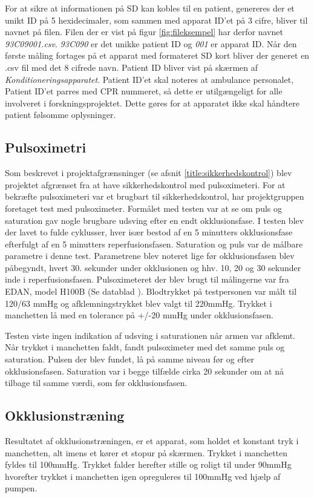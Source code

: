 For at sikre at informationen på SD kan kobles til en patient, genereres der et unikt ID på 5 hexidecimaler, som sammen med apparat ID'et på 3 cifre, bliver til navnet på filen. Filen der er vist på figur \ref{fig:fileksempel} har derfor navnet \textit{93C09001.csv}. \textit{93C090} er det unikke patient ID og \textit{001} er apparat ID. Når den første måling fortages på et apparat med formateret SD kort bliver der generet en .csv fil med det 8 cifrede navn. Patient ID bliver vist på skærmen af \textit{Konditioneringsapparatet}. Patient ID'et skal noteres at ambulance personalet, Patient ID'et parres med CPR nummeret, så dette er utilgængeligt for alle involveret i forskningsprojektet. Dette gøres for at apparatet ikke skal håndtere patient følsomme oplysninger.

\subsection{Pulsoximetri} \label{title:pulsOxi}
Som beskrevet i projektafgrænsninger (se afsnit \ref{title:sikkerhedskontrol}) blev projektet afgrænset fra at have sikkerhedskontrol med pulsoximeteri. For at bekræfte pulsoximeteri var et brugbart til sikkerhedskontrol, har projektgruppen foretaget test med pulsoximeter. Formålet med testen var at se om puls og saturation gav nogle brugbare udsving efter en endt okklusionsfase. I testen blev der lavet to fulde cyklusser, hver især bestod af en 5 minutters okklusionsfase efterfulgt af en 5 minutters reperfusionsfasen. Saturation og puls var de målbare parametre i denne test. Parametrene blev noteret lige før okklusionsfasen blev påbegyndt, hvert 30. sekunder under okklusionen og hhv. 10, 20 og 30 sekunder inde i reperfusionsfasen. Pulsoximeteret der blev brugt til målingerne var fra EDAN, model H100B (Se datablad \cite{RefWorks:30}). Blodtrykket på testpersonen var målt til 120/63 mmHg og afklemningstrykket blev valgt til 220mmHg. Trykket i manchetten lå med en tolerance på +/-20 mmHg under okklusionsfasen. 

Testen viste ingen indikation af udsving i saturationen når armen var afklemt. Når trykket i manchetten faldt, fandt pulsoximeter med det samme puls og saturation. Pulsen der blev fundet, lå på samme niveau før og efter okklusionsfasen. Saturation var i begge tilfælde cirka 20 sekunder om at nå tilbage til samme værdi, som før okklusionsfasen. 

\subsection{Okklusionstræning}
Resultatet af okklusionstræningen, er et apparat, som holdet et konstant tryk i manchetten, alt imens et kører et stopur på skærmen. Trykket i manchetten fyldes til 100mmHg. Trykket falder herefter stille og roligt til under 90mmHg hvorefter trykket i manchetten igen opreguleres til 100mmHg ved hjælp af pumpen. 
 

